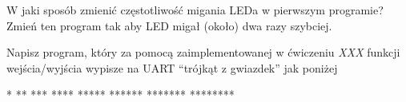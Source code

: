 \documentclass{pdfBooklets}
\begin{document}
\begin{ZadanieDomowe} [1pkt]
W jaki sposób zmienić częstotliwość migania LEDa w pierwszym programie? Zmień ten program tak aby LED migał (około) dwa razy szybciej.
\end{ZadanieDomowe}

\begin{ZadanieDomowe} [2pkt]
  Napisz program, który za pomocą zaimplementowanej w ćwiczeniu \textit{XXX} funkcji wejścia/wyjścia wypisze na UART
  ``trójkąt z gwiazdek'' jak poniżej
  
  \begin{CodeFrame*}[text]{}
    *
    **
    ***
    ****
    *****
    ******
    *******
    ********
  \end{CodeFrame*}
\end{ZadanieDomowe}

\begin{ZadanieDomowe} [3pkt]
  
\end{ZadanieDomowe}

\end{document}
